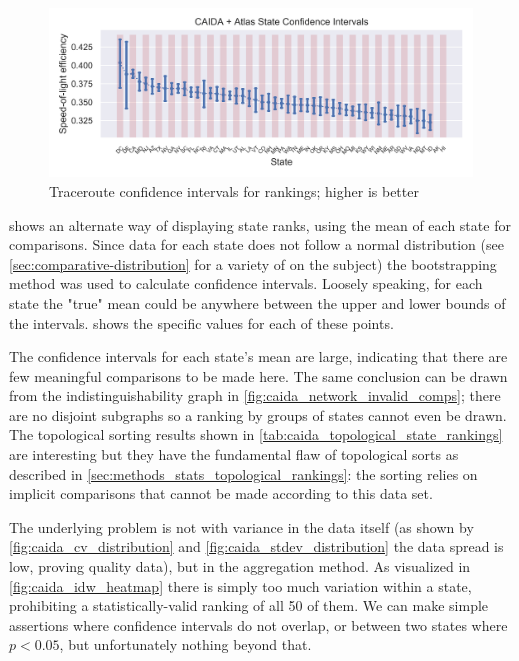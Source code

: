 \begin{figure}[htb]
    \centering
    \includegraphics[width=\textwidth]{images/comparative/confidence_intervals/caida_confidence_interval.png}
    \caption{Traceroute confidence intervals for rankings; higher is better}
    \label{fig:caida_confidence_intervals}
\end{figure}

 shows an alternate way of displaying state ranks, using the mean of each state for comparisons. Since data for each state does not follow a normal distribution (see \cref{sec:comparative-distribution} for a variety of \kdes on the subject) the bootstrapping method was used to calculate confidence intervals. Loosely speaking, for each state the "true" mean could be anywhere between the upper and lower bounds of the intervals.  shows the specific values for each of these points.



The confidence intervals for each state's mean are large, indicating that there are few meaningful comparisons to be made here. The same conclusion can be drawn from the indistinguishability graph in \cref{fig:caida_network_invalid_comps}; there are no disjoint subgraphs so a ranking by groups of states cannot even be drawn. The topological sorting results shown in \cref{tab:caida_topological_state_rankings} are interesting but they have the fundamental flaw of topological sorts as described in \cref{sec:methods_stats_topological_rankings}: the sorting relies on implicit comparisons that cannot be made according to this data set.

The underlying problem is not with variance in the data itself (as shown by \cref{fig:caida_cv_distribution} and \cref{fig:caida_stdev_distribution} the data spread is low, proving quality data), but in the aggregation method. As visualized in \cref{fig:caida_idw_heatmap} there is simply too much variation within a state, prohibiting a statistically-valid ranking of all 50 of them. We can make simple assertions where confidence intervals do not overlap, or between two states where $p<0.05$, but unfortunately nothing beyond that.

